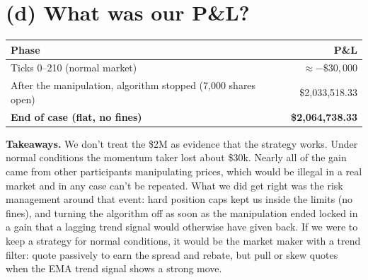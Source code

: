\documentclass[11pt]{article}
\begin{document}
\section{(d) What was our P\&L?}

\begin{table}[H]
\centering
\begin{tabular}{@{}lr@{}}
\toprule
Phase & P\&L \\
\midrule
Ticks 0--210 (normal market) & $\approx -\$30{,}000$ \\
After the manipulation, algorithm stopped (7,000 shares open) & \$2{,}033{,}518.33 \\
\textbf{End of case (flat, no fines)} & \textbf{\$2{,}064{,}738.33} \\
\bottomrule
\end{tabular}
\end{table}

\textbf{Takeaways.} We don't treat the \$2M as evidence that the strategy works.
Under normal conditions the momentum taker lost about \$30k. Nearly all of the
gain came from other participants manipulating prices, which would be illegal in
a real market and in any case can't be repeated. What we did get right was the
risk management around that event: hard position caps kept us inside the limits
(no fines), and turning the algorithm off as soon as the manipulation ended
locked in a gain that a lagging trend signal would otherwise have given back. If
we were to keep a strategy for normal conditions, it would be the market maker
with a trend filter: quote passively to earn the spread and rebate, but pull or
skew quotes when the EMA trend signal shows a strong move.
\end{document}
